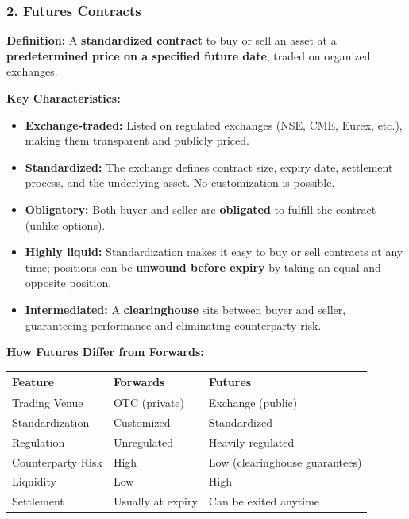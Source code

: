 \documentclass[12pt,openany]{book}
\begin{document}
\subsubsection{2. Futures Contracts}

\textbf{Definition:} A \textbf{standardized contract} to buy or sell an asset at a \textbf{predetermined price on a specified future date}, traded on organized exchanges.

\textbf{Key Characteristics:}
\begin{itemize}[leftmargin=*]
    \item \textbf{Exchange-traded:} Listed on regulated exchanges (NSE, CME, Eurex, etc.), making them transparent and publicly priced.
    \item \textbf{Standardized:} The exchange defines contract size, expiry date, settlement process, and the underlying asset. No customization is possible.
    \item \textbf{Obligatory:} Both buyer and seller are \textbf{obligated} to fulfill the contract (unlike options).
    \item \textbf{Highly liquid:} Standardization makes it easy to buy or sell contracts at any time; positions can be \textbf{unwound before expiry} by taking an equal and opposite position.
    \item \textbf{Intermediated:} A \textbf{clearinghouse} sits between buyer and seller, guaranteeing performance and eliminating counterparty risk.
\end{itemize}

\textbf{How Futures Differ from Forwards:}

\begin{center}
\small
\renewcommand{\arraystretch}{1.2}
\begin{tabular}{|L{0.20\textwidth}|L{0.28\textwidth}|L{0.42\textwidth}|}
\hline
\textbf{Feature} & \textbf{Forwards} & \textbf{Futures} \\ \hline
Trading Venue & OTC (private) & Exchange (public) \\ \hline
Standardization & Customized & Standardized \\ \hline
Regulation & Unregulated & Heavily regulated \\ \hline
Counterparty Risk & High & Low (clearinghouse guarantees) \\ \hline
Liquidity & Low & High \\ \hline
Settlement & Usually at expiry & Can be exited anytime \\ \hline
\end{tabular}
\end{center}
\end{document}
